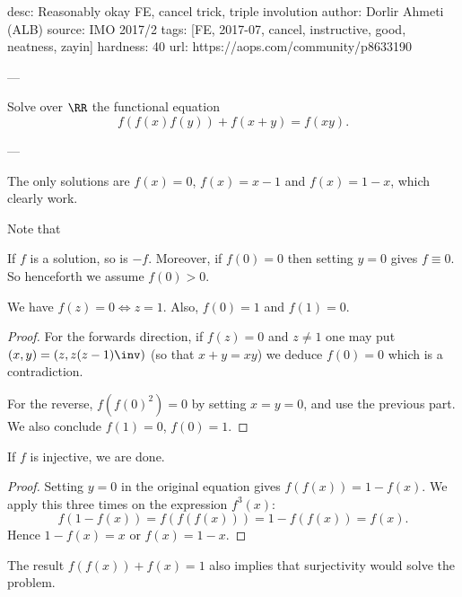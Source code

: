 desc: Reasonably okay FE, cancel trick, triple involution
author: Dorlir Ahmeti (ALB)
source: IMO 2017/2
tags: [FE, 2017-07, cancel, instructive, good, neatness, zayin]
hardness: 40
url: https://aops.com/community/p8633190

---

Solve over $\RR$ the functional equation
\[ f\left( f(x)f(y) \right) + f(x+y) = f(xy). \]

---

The only solutions are $f(x) = 0$, $f(x) = x-1$ and $f(x)=1-x$,
which clearly work.

Note that
\begin{itemize}
  \ii If $f$ is a solution, so is $-f$.
  \ii Moreover, if $f(0)=0$ then setting $y=0$ gives $f\equiv0$.
  So henceforth we assume $f(0)>0$.
\end{itemize}

\begin{claim*}
  We have $f(z) = 0 \iff z =1$.
  Also, $f(0)=1$ and $f(1)=0$.
\end{claim*}
\begin{proof}
  For the forwards direction, if $f(z)=0$ and $z \neq 1$
  one may put $(x,y) = \left( z, z(z-1)\inv \right)$
  (so that $x+y=xy$) we deduce $f(0) = 0$
  which is a contradiction.

  For the reverse, $f(f(0)^2)=0$ by setting $x=y=0$,
  and use the previous part.
  We also conclude $f(1) = 0$, $f(0) = 1$.
\end{proof}

\begin{claim*}
  If $f$ is injective, we are done.
\end{claim*}
\begin{proof}
  Setting $y=0$ in the original equation
  gives $f(f(x)) = 1-f(x)$.
  We apply this three times on the expression $f^3(x)$:
  \[ f(1-f(x)) = f(f(f(x))) = 1 - f(f(x)) = f(x). \]
  Hence $1-f(x) = x$ or $f(x) = 1-x$.
\end{proof}
\begin{remark*}
  The result $f(f(x)) + f(x) = 1$ also implies that surjectivity
  would solve the problem.
\end{remark*}

